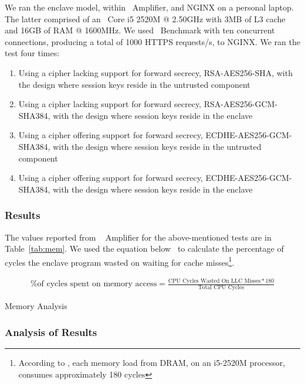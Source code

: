 \documentclass[../../../main.tex]{subfiles}
\begin{document}
We ran the enclave model, within \VTune~Amplifier, and NGINX on a
personal laptop. The latter comprised of an \Intel~Core i5 2520M @
2.50GHz with 3MB of L3 cache and 16GB of RAM @ 1600MHz. We used
\Apache~Benchmark with ten concurrent connections, producing a total
of 1000 HTTPS requests/s, to NGINX. We ran the test four times:
\begin{enumerate}
  \item Using a cipher lacking support for forward secrecy,
    RSA-AES256-SHA, with the design where session keys reside in the
    untrusted component
  \item Using a cipher lacking support for forward secrecy,
    RSA-AES256-GCM-SHA384, with the design where session keys reside in the
    enclave
  \item Using a cipher offering support for forward secrecy,
    ECDHE-AES256-GCM-SHA384, with the design where session keys reside in
    the untrusted component
  \item Using a cipher offering support for forward secrecy,
    ECDHE-AES256-GCM-SHA384, with the design where session keys reside in
    the enclave
\end{enumerate}

\subsubsection*{Results}
The values reported from \VTune~ Amplifier for the above-mentioned
tests are in Table~\ref{tab:mem}. We used the equation
below~\cite{intel-eqn} to calculate the percentage of cycles the
enclave program wasted on waiting for cache misses\footnote{According
  to \Intel, each memory load from DRAM, on an i5-2520M processor,
  consumes approximately 180 cycles}.

\begin{align*}
 \text{\% of cycles spent on memory access} = 
    \frac{\text{CPU Cycles Wasted On LLC Misses} * 180}{\text{Total CPU
    Cycles}}
\end{align*}

\begin{table}[H]
  \caption{Memory Analysis}
  \label{tab:mem}
\end{table}

\subsubsection*{Analysis of Results}
\end{document}
